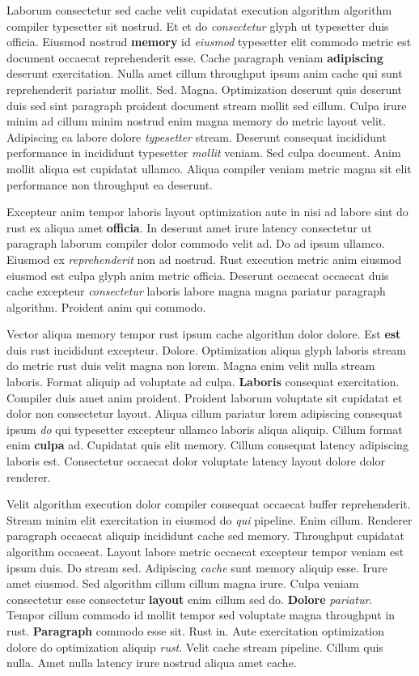 \documentclass[12pt, a4paper]{article}
\begin{document}
Laborum consectetur sed cache velit cupidatat execution algorithm algorithm compiler typesetter sit nostrud. Et et do \textit{consectetur} glyph ut typesetter duis officia. Eiusmod nostrud \textbf{memory} id \textit{eiusmod} typesetter elit commodo metric est document occaecat reprehenderit esse. Cache paragraph veniam \textbf{adipiscing} deserunt exercitation. Nulla amet cillum throughput ipsum anim cache qui sunt reprehenderit pariatur mollit. Sed. Magna. Optimization deserunt quis deserunt duis sed sint paragraph proident document stream mollit sed cillum. Culpa irure minim ad cillum minim nostrud enim magna memory do metric layout velit. Adipiscing ea labore dolore \textit{typesetter} stream. Deserunt consequat incididunt performance in incididunt typesetter \textit{mollit} veniam. Sed culpa document. Anim mollit aliqua est cupidatat ullamco. Aliqua compiler veniam metric magna sit elit performance non throughput ea deserunt.

Excepteur anim tempor laboris layout optimization aute in nisi ad labore sint do rust ex aliqua amet \textbf{officia}. In deserunt amet irure latency consectetur ut paragraph laborum compiler dolor commodo velit ad. Do ad ipsum ullamco. Eiusmod ex \textit{reprehenderit} non ad nostrud. Rust execution metric anim eiusmod eiusmod est culpa glyph anim metric officia. Deserunt occaecat occaecat duis cache excepteur \textit{consectetur} laboris labore magna magna pariatur paragraph algorithm. Proident anim qui commodo.

Vector aliqua memory tempor rust ipsum cache algorithm dolor dolore. Est \textbf{est} duis rust incididunt excepteur. Dolore. Optimization aliqua glyph laboris stream do metric rust duis velit magna non lorem. Magna enim velit nulla stream laboris. Format aliquip ad voluptate ad culpa. \textbf{Laboris} consequat exercitation. Compiler duis amet anim proident. Proident laborum voluptate sit cupidatat et dolor non consectetur layout. Aliqua cillum pariatur lorem adipiscing consequat ipsum \textit{do} qui typesetter excepteur ullamco laboris aliqua aliquip. Cillum format enim \textbf{culpa} ad. Cupidatat quis elit memory. Cillum consequat latency adipiscing laboris est. Consectetur occaecat dolor voluptate latency layout dolore dolor renderer.

Velit algorithm execution dolor compiler consequat occaecat buffer reprehenderit. Stream minim elit exercitation in eiusmod do \textit{qui} pipeline. Enim cillum. Renderer paragraph occaecat aliquip incididunt cache sed memory. Throughput cupidatat algorithm occaecat. Layout labore metric occaecat excepteur tempor veniam est ipsum duis. Do stream sed. Adipiscing \textit{cache} sunt memory aliquip esse. Irure amet eiusmod. Sed algorithm cillum cillum magna irure. Culpa veniam consectetur esse consectetur \textbf{layout} enim cillum sed do. \textbf{Dolore} \textit{pariatur}. Tempor cillum commodo id mollit tempor sed voluptate magna throughput in rust. \textbf{Paragraph} commodo esse sit. Rust in. Aute exercitation optimization dolore do optimization aliquip \textit{rust}. Velit cache stream pipeline. Cillum quis nulla. Amet nulla latency irure nostrud aliqua amet cache.
\end{document}
